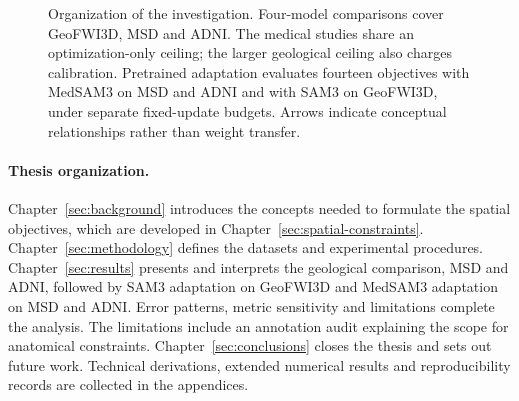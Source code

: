 \documentclass[12pt,a4paper]{article}
\begin{document}
\begin{figure}[htbp]
\caption{Organization of the investigation. Four-model comparisons cover
GeoFWI3D, MSD and ADNI. The medical studies share an optimization-only
ceiling; the larger geological ceiling also charges calibration.
Pretrained adaptation evaluates fourteen objectives with MedSAM3 on MSD
and ADNI and with SAM3 on GeoFWI3D, under separate fixed-update budgets.
Arrows indicate conceptual relationships rather than weight transfer.}

\label{fig:thesis-overview}
\end{figure}

\paragraph{Thesis organization.}\label{sec:organization}
Chapter~\ref{sec:background} introduces the concepts needed to formulate
the spatial objectives, which are developed in
Chapter~\ref{sec:spatial-constraints}. Chapter~\ref{sec:methodology}
defines the datasets and experimental procedures.
Chapter~\ref{sec:results} presents and interprets the geological comparison,
MSD and ADNI, followed by SAM3 adaptation on GeoFWI3D and MedSAM3
adaptation on MSD and ADNI. Error patterns, metric
sensitivity and limitations complete the analysis. The limitations include
an annotation audit explaining the scope for anatomical constraints.
Chapter~\ref{sec:conclusions} closes the thesis and sets out future work. Technical derivations, extended numerical results
and reproducibility records are collected in the appendices.
\end{document}
